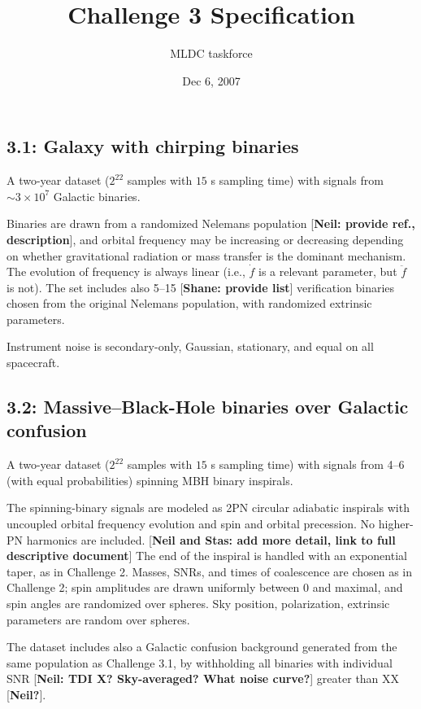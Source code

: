 \documentclass[11pt]{article}
\title{Challenge 3 Specification}
\author{MLDC taskforce}
\date{Dec 6, 2007}
\begin{document}
\maketitle

\subsection*{3.1: Galaxy with chirping binaries}

A two-year dataset ($2^{22}$ samples with $15$ s sampling time) with signals from $\sim 3 \times 10^7$ Galactic binaries.

Binaries are drawn from a randomized Nelemans population [\textbf{Neil: provide ref., description}], and orbital frequency may be increasing or decreasing depending on whether gravitational radiation or mass transfer is the dominant mechanism. The evolution of frequency is always linear (i.e., $\dot{f}$ is a relevant parameter, but $\ddot{f}$ is not). The set includes also 5--15 [\textbf{Shane: provide list}] verification binaries chosen from the original Nelemans population, with randomized extrinsic parameters.

Instrument noise is secondary-only, Gaussian, stationary, and equal on all spacecraft. 

\subsection*{3.2: Massive--Black-Hole binaries over Galactic confusion}

A two-year dataset ($2^{22}$ samples with $15$ s sampling time) with signals from 4--6 (with equal probabilities) spinning MBH binary inspirals.

The spinning-binary signals are modeled as 2PN circular adiabatic inspirals with uncoupled orbital frequency evolution and spin and orbital precession. No higher-PN harmonics are included. [\textbf{Neil and Stas: add more detail, link to full descriptive document}] The end of the inspiral is handled with an exponential taper, as in Challenge 2. Masses, SNRs, and times of coalescence are chosen as in Challenge 2; spin amplitudes are drawn uniformly between 0 and maximal, and spin angles are randomized over spheres. Sky position, polarization, extrinsic parameters are random over spheres.

The dataset includes also a Galactic confusion background generated from the same population as Challenge 3.1, by withholding all binaries with individual SNR [\textbf{Neil: TDI X? Sky-averaged? What noise curve?}] greater than XX [\textbf{Neil?}].
\end{document}
